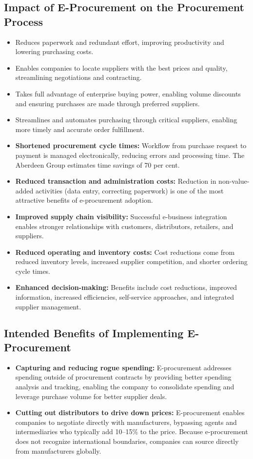\documentclass[12pt,a4paper]{article}
\begin{document}
\subsection{Impact of E-Procurement on the Procurement Process}

\begin{itemize}
    \item Reduces paperwork and redundant effort, improving productivity and lowering purchasing costs.
    \item Enables companies to locate suppliers with the best prices and quality, streamlining negotiations and contracting.
    \item Takes full advantage of enterprise buying power, enabling volume discounts and ensuring purchases are made through preferred suppliers.
    \item Streamlines and automates purchasing through critical suppliers, enabling more timely and accurate order fulfillment.
    \item \textbf{Shortened procurement cycle times:} Workflow from purchase request to payment is managed electronically, reducing errors and processing time. The Aberdeen Group estimates time savings of 70 per cent.
    \item \textbf{Reduced transaction and administration costs:} Reduction in non-value-added activities (data entry, correcting paperwork) is one of the most attractive benefits of e-procurement adoption.
    \item \textbf{Improved supply chain visibility:} Successful e-business integration enables stronger relationships with customers, distributors, retailers, and suppliers.
    \item \textbf{Reduced operating and inventory costs:} Cost reductions come from reduced inventory levels, increased supplier competition, and shorter ordering cycle times.
    \item \textbf{Enhanced decision-making:} Benefits include cost reductions, improved information, increased efficiencies, self-service approaches, and integrated supplier management.
\end{itemize}

\subsection{Intended Benefits of Implementing E-Procurement}

\begin{itemize}
    \item \textbf{Capturing and reducing rogue spending:} E-procurement addresses spending outside of procurement contracts by providing better spending analysis and tracking, enabling the company to consolidate spending and leverage purchase volume for better supplier deals.
    \item \textbf{Cutting out distributors to drive down prices:} E-procurement enables companies to negotiate directly with manufacturers, bypassing agents and intermediaries who typically add 10--15\% to the price. Because e-procurement does not recognize international boundaries, companies can source directly from manufacturers globally.
\end{itemize}
\end{document}
